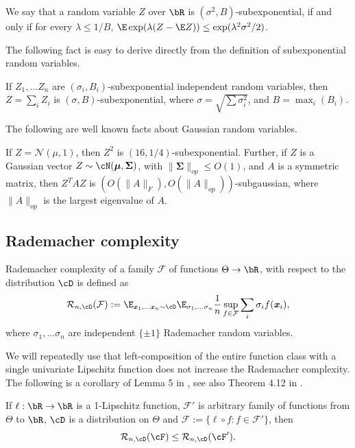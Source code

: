 \begin{definition}
    We say that a random variable $Z$ over $\bR$ is $(\sigma^2, B)$-subexponential, if and only if for every $\lambda \leq 1/B$, $\E \exp(\lambda (Z - \E Z)) \leq \exp(\lambda^2\sigma^2/2)$.
\end{definition}
The following fact is easy to derive directly from the definition of subexponential random variables. 
\begin{fact}
    If $Z_1, \ldots Z_n$ are $(\sigma_i, B_i)$-subexponential independent random variables, then $Z = \sum_i Z_i$ is $(\sigma, B)$-subexponential, where $\sigma = \sqrt{\sum \sigma_i^2}$, and $B = \max_i(B_i)$.
\end{fact}
The following are well known facts about Gaussian random variables.
\begin{fact}\label{fact:quad-gauss}
    If $Z = \mathcal{N}(\mu, 1)$, then $Z^2$ is $(16, 1/4)$-subexponential. Further, if $Z$ is a Gaussian vector $Z \sim \cN(\boldsymbol{\mu}, \boldsymbol{\Sigma})$, with $\|\boldsymbol{\Sigma}\|_{op}\leq O(1)$, and $A$ is a symmetric matrix, then $Z^T A Z$ is $(O(\|A\|_F), O(\|A\|_{op}))$-subgaussian, where $\|A\|_{op}$ is the largest eigenvalue of $A$.
\end{fact}


\subsection*{Rademacher complexity}
\begin{definition}
Rademacher complexity of a family $\mathcal{F}$ of functions $\Theta \to \bR$, with respect to the distribution $\cD$ is defined as
\begin{equation*}
    \mathcal{R}_{n, \cD} (\mathcal{F}) := \E_{\xx_1, \ldots \xx_n \sim \cD} \E_{\sigma_1, \ldots \sigma_n} \frac{1}{n} \sup_{f \in \mathcal{F}} \sum_i \sigma_i f(\xx_i),
\end{equation*}
where $\sigma_1, \ldots \sigma_n$ are independent $\{\pm 1\}$ Rademacher random variables.
\end{definition}
We will repeatedly use that left-composition of the entire function class with a single univariate Lipschitz function does not increase the Rademacher complexity. The following is a corollary of Lemma 5 in \cite{meir2003generalization}, see also Theorem 4.12 in \cite{ledoux2013probability}.
\begin{theorem}
\label{thm:rademacher-lipschitz-composition}
If $\ell : \bR \to \bR$ is a 1-Lipschitz function,  $\mathcal{F}'$ is arbitrary family of functions from $\Theta$ to $\bR$, $\cD$ is a distribution on $\Theta$ and $\mathcal{F} := \{ \ell \circ f : f \in \mathcal{F}'\}$, then
\begin{equation*}
    \mathcal{R}_{n, \cD}(\cF) \leq \mathcal{R}_{n, \cD}(\cF').
\end{equation*}
\end{theorem}

